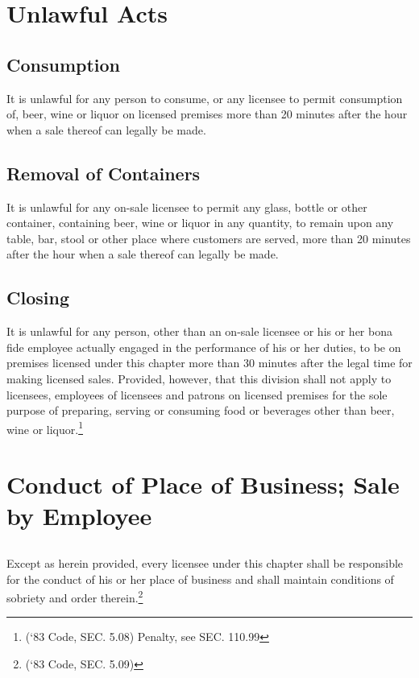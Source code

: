 
\setcounter{section}{39}
\section{Unlawful Acts}
\subsection{Consumption}
It is unlawful for any person to consume, or any licensee to permit consumption of, beer, wine or liquor on licensed premises more than 20 minutes after the hour when a sale thereof can legally be made.
\subsection{Removal of Containers}
It is unlawful for any on-sale licensee to permit any glass, bottle or other container, containing beer, wine or liquor in any quantity, to remain upon any table, bar, stool or other place where customers are served, more than 20 minutes after the hour when a sale thereof can legally be made.
\subsection{Closing}
It is unlawful for any person, other than an on-sale licensee or his or her bona fide employee actually engaged in the performance of his or her duties, to be on premises licensed under this chapter more than 30 minutes after the legal time for making licensed sales.  Provided, however, that this division shall not apply to licensees, employees of licensees and patrons on licensed premises for the sole purpose of preparing, serving or consuming food or beverages other than beer, wine or liquor.\footnote{(‘83 Code, SEC. 5.08)  Penalty, see SEC. 110.99}

\section{Conduct of Place of Business; Sale by Employee}
\subsection{}
Except as herein provided, every licensee under this chapter shall be responsible for the conduct of his or her place of business and shall maintain conditions of sobriety and order therein.\footnote{(‘83 Code, SEC. 5.09)}
